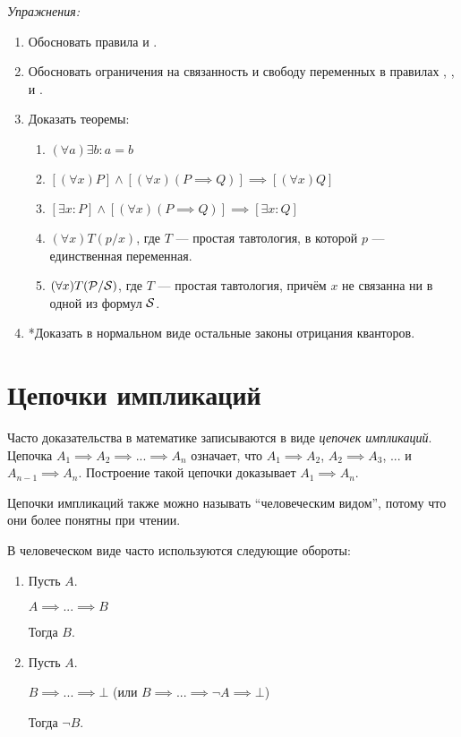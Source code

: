 {\it Упражнения:}
\begin{enumerate}
	\item{}Обосновать правила \Eii{} и \Eee{}.
	\item{}Обосновать ограничения на связанность и свободу переменных в правилах
	\Aii{}, \Aee{}, \Eii{} и \Eee{}.
	\pagebreak
	\item{}\label{ex:obv_thm}Доказать теоремы:
	\begin{fullwidth}
		\begin{multicols}{2}
			\begin{enumerate}
				\item{}$(\forall a)\exists b:a=b$
				\item{}$[(\forall x)P]\land[(\forall x)(P\implies Q)]
					\implies [(\forall x)Q]$\label{thm:obv_forall}
				\item{}$[\exists x:P]\land[(\forall x)(P\implies Q)]
					\implies [\exists x:Q]$
				\item{}$(\forall x)T(p/x)$, где $T$ --- простая тавтология,
				в которой $p$ --- единственная переменная.
				\item{}$(\forall x)T(\mathcal P/\mathcal S)$, где $T$ --- простая тавтология,
				причём $x$ не связанна ни в одной из формул $\mathcal S$.\label{thm:obv_taut}
			\end{enumerate}
		\end{multicols}
	\end{fullwidth}
	\item{}*Доказать в нормальном виде остальные законы отрицания кванторов.
\end{enumerate}

\section{Цепочки импликаций}

Часто доказательства в математике записываются в виде {\it цепочек импликаций}.
Цепочка $A_1\implies A_2\implies...\implies A_{n}$ означает, что $A_1\implies A_2$,
$A_2\implies A_3$, ... и $A_{n-1}\implies A_{n}$.
Построение такой цепочки доказывает $A_1\implies A_{n}$.

Цепочки импликаций также можно называть ``человеческим видом'', потому что они более
понятны при чтении.

В человеческом виде часто используются следующие обороты:
\begin{enumerate}
	\item{}
	Пусть $A$.

	$A\implies ...\implies B$

	Тогда $B$.
	\item{}
	Пусть $A$.

	$B\implies ...\implies \bot$ (или $B\implies ...\implies \lnot A\implies\bot$)

	Тогда $\lnot B$.
\end{enumerate}

